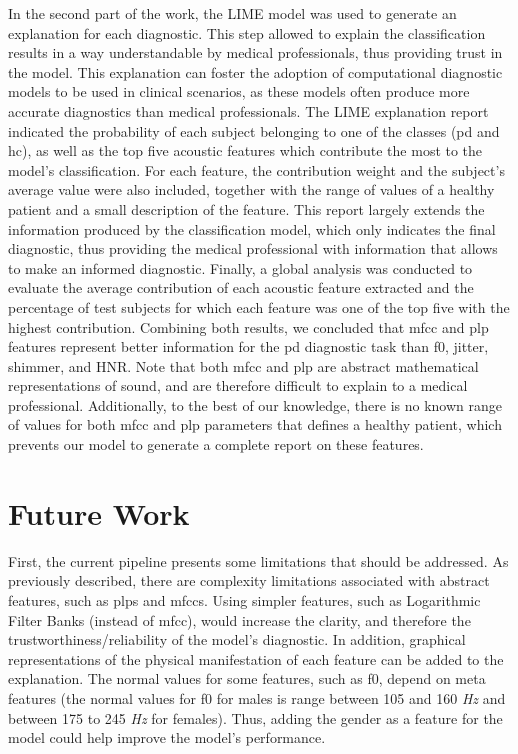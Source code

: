 In the second part of the work, the LIME model was used to generate an explanation for each diagnostic. This step allowed to explain the classification results in a way understandable by medical professionals, thus providing trust in the model. This explanation can foster the adoption of computational diagnostic models to be used in clinical scenarios, as these models often produce more accurate diagnostics than medical professionals. The LIME explanation report indicated the probability of each subject belonging to one of the classes (\gls{pd} and \gls{hc}), as well as the top five acoustic features which contribute the most to the model's classification. For each feature, the contribution weight and the subject's average value were also included, together with the range of values of a healthy patient and a small description of the feature. This report largely extends the information produced by the classification model, which only indicates the final diagnostic, thus providing the medical professional with information that allows to make an informed diagnostic. Finally, a global analysis was conducted to evaluate the average contribution of each acoustic feature extracted and the percentage of test subjects for which each feature was one of the top five with the highest contribution. Combining both results, we concluded that \gls{mfcc} and \gls{plp} features represent better information for the \gls{pd} diagnostic task than \gls{f0}, jitter, shimmer, and HNR. Note that both \gls{mfcc} and \gls{plp} are abstract mathematical representations of sound, and are therefore difficult to explain to a medical professional. Additionally, to the best of our knowledge, there is no known range of values for both \gls{mfcc} and \gls{plp} parameters that defines a healthy patient, which prevents our model to generate a complete report on these features.

\section{Future Work}

First, the current pipeline presents some limitations that should be addressed. As previously described, there are complexity limitations associated with abstract features, such as \gls{plp}s and \gls{mfcc}s. Using simpler features, such as Logarithmic Filter Banks \cite{logfilterbank} (instead of \gls{mfcc}), would increase the clarity, and therefore the trustworthiness/reliability of the model's diagnostic. In addition, graphical representations of the physical manifestation of each feature can be added to the explanation. The normal values for some features, such as \gls{f0}, depend on meta features (the normal values for \gls{f0} for males is range between 105 and 160 \textit{Hz} and between 175 to 245 \textit{Hz} for females). Thus, adding the gender as a feature for the model could help improve the model's performance.


